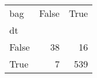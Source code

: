 \begin{tabular}{lrr}
\toprule
bag &  False &  True  \\
dt    &        &        \\
\midrule
False &     38 &     16 \\
True  &      7 &    539 \\
\bottomrule
\end{tabular}

